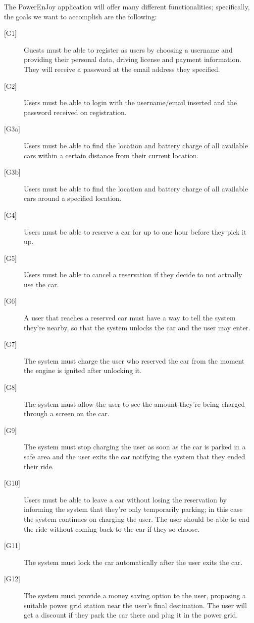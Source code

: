 \documentclass[english]{article}
\begin{document}
The PowerEnJoy application will offer many different functionalities; specifically, the goals we want to accomplish are the following:
\begin{description}
	\item[{[G1]}]{Guests must be able to register as users by choosing a username and providing their personal data, driving license and payment information. They will receive a password at the email address they specified.}
	\item[{[G2]}]{Users must be able to login with the username/email inserted and the password received on registration.}
	\item[{[G3a]}]{Users must be able to find the location and battery charge of all available cars within a certain distance from their current location.}
	\item[{[G3b]}]{Users must be able to find the location and battery charge of all available cars around a specified location.}
	\item[{[G4]}]{Users must be able to reserve a car for up to one hour before they pick it up.}
	\item[{[G5]}]{Users must be able to cancel a reservation if they decide to not actually use the car.}
	\item[{[G6]}]{A user that reaches a reserved car must have a way to tell the system they’re nearby, so that the system unlocks the car and the user may enter.}
	\item[{[G7]}]{The system must charge the user who reserved the car from the moment the engine is ignited after unlocking it.}
	\item[{[G8]}]{The system must allow the user to see the amount they’re being charged through a screen on the car.}
	\item[{[G9]}]{The system must stop charging the user as soon as the car is parked in a safe area and the user exits the car notifying the system that they ended their ride.}
	\item[{[G10]}]{Users must be able to leave a car without losing the reservation by informing the system that they’re only temporarily parking; in this case the system continues on charging the user. The user should be able to end the ride without coming back to the car if they so choose.}
	\item[{[G11]}]{The system must lock the car automatically after the user exits the car.}
	\item[{[G12]}]{The system must provide a money saving option to the user, proposing a suitable power grid station near the user’s final destination. The user will get a discount if they park the car there and plug it in the power grid.}

\end{description}
\end{document}
